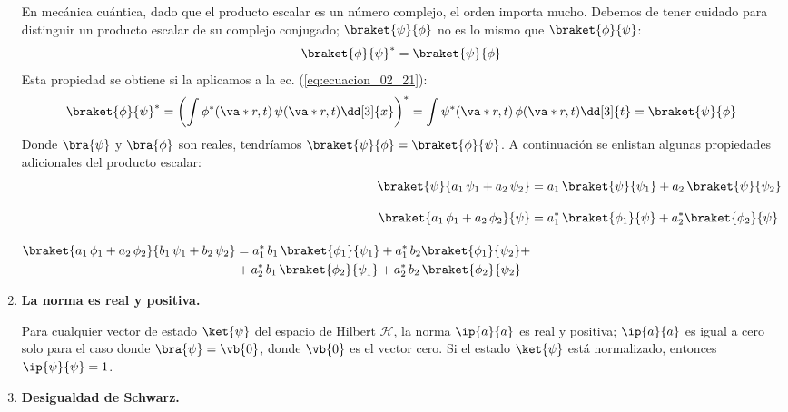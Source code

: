 \begin{enumerate}[label=\alph*)]
En mecánica cuántica, dado que el producto escalar es un número complejo, el orden importa mucho. Debemos de tener cuidado para distinguir un producto escalar de su complejo conjugado; $\braket{\psi}{\phi}$ no es lo mismo que $\braket{\phi}{\psi}$:
\begin{equation}
\braket{\phi}{\psi}^{*} = \braket{\psi}{\phi}
\label{eq:ecuacion_02_29}
\end{equation}
Esta propiedad se obtiene si la aplicamos a la ec. (\ref{eq:ecuacion_02_21}):
\begin{equation}
\braket{\phi}{\psi}^{*} = \left( \int \phi^{*} (\va*{r},t) \, \psi (\va*{r}, t) \dd[3]{x} \right)^{*} = \int \psi^{*} (\va*{r}, t) \, \phi (\va*{r}, t) \dd[3]{t} = \braket{\psi}{\phi}
\label{eq:ecuacion_02_30}
\end{equation}
Donde $\bra{\psi}$ y $\bra{\phi}$ son reales, tendríamos $\braket{\psi}{\phi} = \braket{\phi}{\psi}$. A continuación se enlistan algunas propiedades adicionales del producto escalar:
\begin{align}
\braket{\psi}{a_{1} \, \psi_{1} + a_{2} \, \psi_{2}} &= a_{1} \, \braket{\psi}{\psi_{1}} + a_{2} \, \braket{\psi}{\psi_{2}} \label{ec:ecuacion_02_31} \\[1em]
\braket{a_{1} \, \phi_{1} + a_{2} \, \phi_{2}}{\psi} &= a_{1}^{*} \, \braket{\phi_{1}}{\psi} + a_{2}^{*} \braket{\phi_{2}}{\psi} \label{ec:ecuacion_02_32} \\[1em]
\begin{split}
\braket{a_{1} \, \phi_{1} + a_{2} \, \phi_{2}}{b_{1} \, \psi_{1} + b_{2} \, \psi_{2}} &= a_{1}^{*} \, b_{1} \, \braket{\phi_{1}}{\psi_{1}} + a_{1}^{*} \, b_{2} \braket{\phi_{1}}{\psi_{2}} + \\
&+ a_{2}^{*} \, b_{1} \, \braket{\phi_{2}}{\psi_{1}} + a_{2}^{*} \, b_{2} \, \braket{\phi_{2}}{\psi_{2}} 
\end{split}
\end{align}
\item \textbf{La norma es real y positiva.}

Para cualquier vector de estado $\ket{\psi}$ del espacio de Hilbert $\mathcal{H}$, la norma $\ip{a}{a}$ es real y positiva; $\ip{a}{a}$ es igual a cero solo para el caso donde $\bra{\psi} = \vb{0}$, donde $\vb{0}$ es el vector cero. Si el estado $\ket{\psi}$ está normalizado, entonces $\ip{\psi}{\psi} = 1$.
\item \textbf{Desigualdad de Schwarz.}


\end{enumerate}
